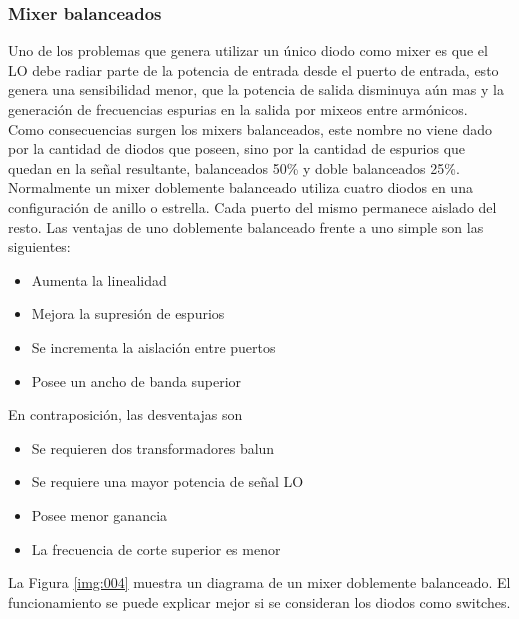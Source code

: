 \documentclass[a4paper,10pt]{article}
\begin{document}
	\subsubsection{Mixer balanceados}
	\indent Uno de los problemas que genera utilizar un único diodo como mixer 
	es que el LO debe radiar parte de la potencia de entrada desde el puerto de 
	entrada, esto genera una sensibilidad menor, que la potencia de salida 
	disminuya aún mas y la generación de frecuencias espurias en la salida por 
	mixeos entre armónicos. \\
	\indent Como consecuencias surgen los mixers balanceados, este nombre no 
	viene dado por la cantidad de diodos que poseen, sino por la cantidad de 
	espurios que quedan en la señal resultante, balanceados 50\% y doble 
	balanceados 25\%. \\
	\indent Normalmente un mixer doblemente balanceado utiliza cuatro diodos en 
	una configuración de anillo o estrella. Cada puerto del mismo permanece
	aislado del resto. Las ventajas de uno doblemente balanceado frente a uno 
	simple son las siguientes:
	
	\begin{itemize}
		\item Aumenta la linealidad
		\item Mejora la supresión de espurios
		\item Se incrementa la aislación entre puertos
		\item Posee un ancho de banda superior
	\end{itemize}

	\indent En contraposición, las desventajas son

	\begin{itemize}
		\item Se requieren dos transformadores balun
		\item Se requiere una mayor potencia de señal LO
		\item Posee menor ganancia
		\item La frecuencia de corte superior es menor
	\end{itemize}

	\indent La Figura \ref{img:004} muestra un diagrama de un mixer doblemente 
	balanceado. El funcionamiento se puede explicar mejor si se consideran los 
	diodos como switches. \\
	
\end{document}
